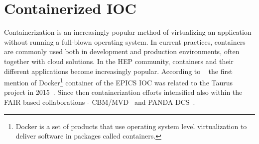 \section{Containerized IOC}
\label{containerizer_ioc}
Containerization is an increasingly popular method of virtualizing an application without running a full-blown operating system. In current practices, containers are commonly used both in development and production environments, often together with cloud solutions. In the \gls{HEP} community, containers and their different applications become increasingly popular. According to ~\cite{Klaus2021} the first mention of Docker\footnote{Docker is a set of products that use operating system level virtualization to deliver software in packages called containers.} container of the \gls{EPICS} \gls{IOC} was related to the Taurus project in 2015~\cite{taurus}. Since then containerization efforts intensified also within the \gls{FAIR} based collaborations - \gls{CBM}/\gls{MVD}~\cite{Klaus2021} and PANDA DCS~\cite{PANDA_1}.

